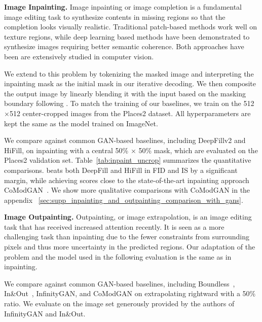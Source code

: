 \vspace{2mm}
\noindent\textbf{Image Inpainting.}
\label{ssec:inpainting}
Image inpainting or image completion is a fundamental image editing task to synthesize contents in missing regions so that the completion looks visually realistic. Traditional patch-based methods\cite{Barnes:2009:patchmatch} work well on texture regions, while deep learning based methods\cite{yu2019free, yi2020contextual, zhao2021comodgan, saharia2021palette, esser2021imagebart} have been demonstrated to synthesize images requiring better semantic coherence. Both approaches have been are extensively studied in computer vision.

We extend \model to this problem by tokenizing the masked image and interpreting the inpainting mask as the initial mask in our iterative decoding. We then composite the output image by linearly blending it with the input based on the masking boundary following \cite{cheng2021inout}.
To match the training of our baselines, we train \model on the 512$\times$512 center-cropped images from the Places2\cite{zhou2017places} dataset. All hyperparameters are kept the same as the \model model trained on ImageNet.

We compare \model against common GAN-based baselines, including DeepFillv2\cite{yu2019free} and HiFill\cite{yi2020contextual}, on inpainting with a central 50\% $\times$ 50\% mask, which are evaluated on the Places2 validation set. Table~\ref{tab:inpaint_uncrop} summarizes the quantitative comparisons. \model beats both DeepFill and HiFill in FID and IS by a significant margin, while achieving scores close to the state-of-the-art inpainting approach CoModGAN~\cite{zhao2021comodgan}. We show more qualitative comparisons with CoModGAN in the appendix ~\ref{sec:supp_inpainting_and_outpainting_comparison_with_gans}.


\vspace{2mm}
\noindent\textbf{Image Outpainting.}
\label{ssec:outpainting}
Outpainting, or image extrapolation, is an image editing task that has received increased attention recently. It is seen as a more challenging task than inpainting due to the fewer constraints from surrounding pixels and thus more uncertainty in the predicted regions. Our adaptation of the problem and the model used in the following evaluation is the same as in inpainting.

We compare against common GAN-based baselines, including Boundless~\cite{teterwak2019boundless}, In\&Out~\cite{cheng2021inout}, InfinityGAN\cite{lin2021infinitygan}, and CoModGAN\cite{zhao2021comodgan} on extrapolating rightward with a 50\% ratio. We evaluate on the image set generously provided by the authors of InfinityGAN\cite{lin2021infinitygan} and In\&Out\cite{cheng2021inout}.

